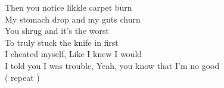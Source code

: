 
Then you notice likkle carpet burn \\
My stomach drop and my guts churn \\
You shrug and it's the worst \\
To truly stuck the knife in first \\


I cheated myself, Like I knew I would \\
I told you I was trouble, Yeah, you know that I'm no good \\
( repeat )


